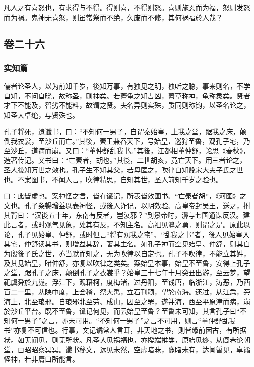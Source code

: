 \documentclass[]{article}
\begin{document}
凡人之有喜怒也，有求得与不得。得则喜，不得则怒。喜则施恩而为福，怒则发怒而为祸。鬼神无喜怒，则虽常祭而不绝，久废而不修，其何祸福於人哉？

\hypertarget{header-n873}{%
\subsection{卷二十六}\label{header-n873}}

\hypertarget{header-n874}{%
\subsubsection{实知篇}\label{header-n874}}

儒者论圣人，以为前知千岁，後知万事，有独见之明，独听之聪，事来则名，不学自知，不问自晓，故称圣，则神矣。若蓍龟之知吉凶，蓍草称神，龟称灵矣。贤者才下不能及，智劣不能料，故谓之贤。夫名异则实殊，质同则称钧，以圣名论之，知圣人卓绝，与贤殊也。

孔子将死，遗谶书，曰：``不知何一男子，自谓秦始皇，上我之堂，踞我之床，颠倒我衣裳，至沙丘而亡。''其後，秦王兼吞天下，号始皇，巡狩至鲁，观孔子宅，乃至沙丘，道病而崩。又曰：``董仲舒乱我书。''其後，江都相董仲舒，论思《春秋》，造著传记。又书曰：``亡秦者，胡也。''其後，二世胡亥，竟亡天下。用三者论之，圣人後知万世之效也。孔子生不知其父，若母匿之，吹律自知殷宋大夫子氏之世也。不案图书，不闻人言，吹律精思，自知其世，圣人前知千岁之验也。

曰：此皆虚也。案神怪之言，皆在谶记，所表皆效图书。``亡秦者胡''，《河图》之文也。孔子条暢增益以表神怪，或後人诈记，以明效验。高皇帝封吴王，送之，拊其背曰：``汉後五十年，东南有反者，岂汝邪？''到景帝时，濞与七国通谋反汉。建此言者，或时观气见象，处其有反，不知主名。高祖见濞之勇，则谓之是。原此以论，孔子见始皇、仲舒，或时但言``将有观我之宅''、``乱我之书''者，後人见始皇入其宅，仲舒读其书，则增益其辞，著其主名。如孔子神而空见始皇、仲舒，则其自为殷後子氏之世，亦当默而知之，无为吹律以自定也。孔子不吹律，不能立其姓，及其见始皇，睹仲舒，亦复以吹律之类矣。案始皇本事，始皇不至鲁，安得上孔子之堂，踞孔子之床，颠倒孔子之衣裳乎？始皇三十七年十月癸丑出游，至云梦，望祀虞舜於九嶷。浮江下，观藉柯，度梅渚，过丹阳，至钱唐，临浙江，涛恶，乃西百二十里，从陕中度，上会稽，祭大禹，立石刊颂，望於南海。还过，从江乘，旁海上，北至琅邪。自琅邪北至劳、成山，因至之罘，遂并海，西至平原津而病，崩於沙丘平台。既不至鲁，谶记何见，而云始皇至鲁？至鲁未可知，其言孔子曰``不知何一男子''之言，亦未可用。``不知何一男子''之言不可用，则言``董仲舒乱我书''亦复不可信也。行事，文记谲常人言耳，非天地之书，则皆缘前因古，有所据状。如无闻见，则无所状。凡圣人见祸福也，亦揆端推类，原始见终，从闾巷论朝堂，由昭昭察冥冥。谶书秘文，远见未然，空虚暗昧，豫睹未有，达闻暂见，卓谲怪神，若非庸口所能言。
\end{document}
